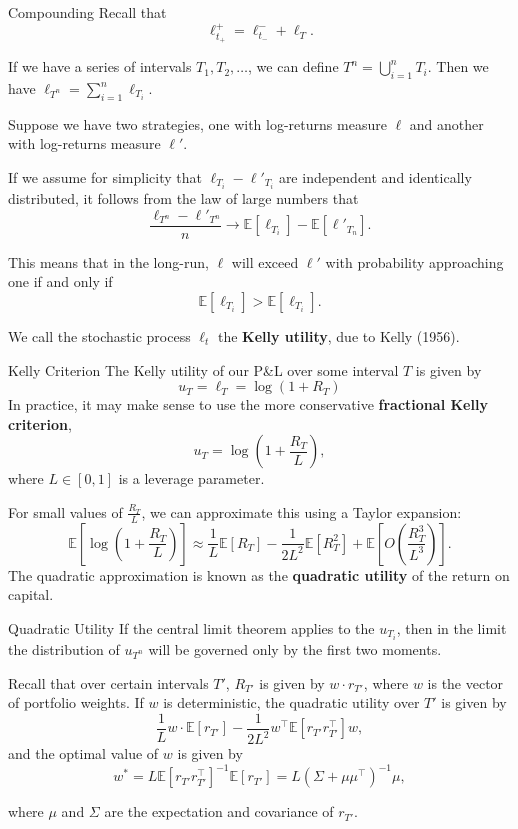 \documentclass{beamer}
\begin{document}
\begin{frame}{Compounding}
	Recall that
	$$\ell_{t_+}^+ = \ell_{t_-}^- + \ell_T.$$

	If we have a series of intervals $T_1,T_2,\ldots$, we can define $T^n=\bigcup_{i=1}^n T_i$. Then we have $\ell_{T^n} = \sum_{i=1}^n \ell_{T_i}$.

	Suppose we have two strategies, one with log-returns measure $\ell$ and another with log-returns measure $\ell'$.

	If we assume for simplicity that $\ell_{T_i} - \ell'_{T_i}$ are independent and identically distributed, it follows from the law of large numbers that
	$$\frac{\ell_{T^n}-\ell'_{T^n}}{n} \to \mathbb{E}[\ell_{T_i}] - \mathbb{E}[\ell'_{T_n}].$$

	This means that in the long-run, $\ell$ will exceed $\ell'$ with probability approaching one if and only if
	$$\mathbb{E}[\ell_{T_i}]>\mathbb{E}[\ell_{T_i}].$$

	We call the stochastic process $\ell_t$ the \textbf{Kelly utility}, due to Kelly (1956).
\end{frame}

\begin{frame}{Kelly Criterion}
	The Kelly utility of our P\&L over some interval $T$ is given by
	$$u_T = \ell_T = \log(1 + R_T)$$
	In practice, it may make sense to use the more conservative \textbf{fractional Kelly criterion},
	$$u_T = \log\left(1 +\frac{R_T}{L}\right),$$
	where $L\in [0,1]$ is a leverage parameter.%

	For small values of $\frac{R_T}{L}$, we can approximate this using a Taylor expansion:
	$$\mathbb{E}[\log (1 + \frac{R_T}{L})] \approx \frac{1}{L}\mathbb{E}[R_T] - \frac{1}{2L^2}\mathbb{E}[R_T^2] + \mathbb{E}[O(\frac{R_T^3}{L^3})].$$
	The quadratic approximation is known as the \textbf{quadratic utility} of the return on capital.
\end{frame}

\begin{frame}{Quadratic Utility}
	If the central limit theorem applies to the $u_{T_i}$, then in the limit the distribution of $u_{T^n}$ will be governed only by the first two moments.

	Recall that over certain intervals $T'$, $R_{T'}$ is given by $w \cdot r_{T'}$, where $w$ is the vector of portfolio weights. If $w$ is deterministic, the quadratic utility over $T'$ is given by
	$$\frac{1}{L} w \cdot \mathbb{E}[r_{T'}] - \frac{1}{2L^2} w^\top \mathbb{E}[r_{T'} r_{T'}^\top] w,$$
	and the optimal value of $w$ is given by
	$$w^* = L \mathbb{E}[r_{T'} r_{T'}^\top]^{-1} \mathbb{E}[r_{T'}] = L (\Sigma+\mu \mu^\top)^{-1}\mu,$$

	where $\mu$ and $\Sigma$ are the expectation and covariance of $r_{T'}$.
\end{frame}
\end{document}

